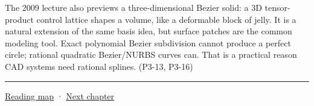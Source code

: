 The 2009 lecture also previews a three-dimensional Bezier solid: a 3D tensor-product control lattice shapes a volume, like a deformable block of jelly. It is a natural extension of the same basis idea, but surface patches are the common modeling tool. Exact polynomial Bezier subdivision cannot produce a perfect circle; rational quadratic Bezier/NURBS curves can. That is a practical reason CAD systems need rational splines. (P3-13, P3-16)

\begin{center}\rule{0.5\linewidth}{0.5pt}\end{center}

\hyperref[volume-reading-map]{Reading map} · \hyperref[03-visual-computing-i-ch002-surfaces-topology-and-parameterization]{Next chapter}
